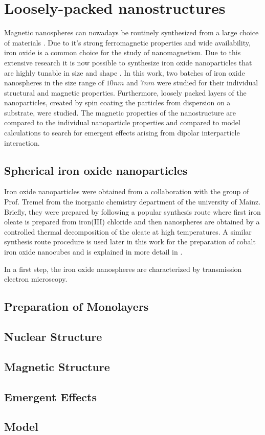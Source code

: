 \documentclass[\main/dresen_thesis.tex]{subfiles}
\begin{document}
\chapter{Loosely-packed nanostructures}\label{ch:looselyPackedNS}
Magnetic nanospheres can nowadays be routinely synthesized from a large choice of materials \cite{Gubin_2005_Magne}.
Due to it's strong ferromagnetic properties and wide availability, iron oxide is a common choice for the study of nanomagnetism.
Due to this extensive research it is now possible to synthesize iron oxide nanoparticles that are highly tunable in size and shape \cite{Wetterskog_2014_Preci}.
In this work, two batches of iron oxide nanospheres in the size range of $10 \unit{nm}$ and $7 \unit{nm}$ were studied for their individual structural and magnetic properties.
Furthermore, loosely packed layers of the nanoparticles, created by spin coating the particles from dispersion on a substrate, were studied.
The magnetic properties of the nanostructure are compared to the individual nanoparticle properties and compared to model calculations to search for emergent effects arising from dipolar interparticle interaction.

\section{Spherical iron oxide nanoparticles}
Iron oxide nanoparticles were obtained from a collaboration with the group of Prof. Tremel from the inorganic chemistry department of the university of Mainz.
Briefly, they were prepared by following a popular synthesis route where first iron oleate is prepared from iron(III) chloride and then nanospheres are obtained by a controlled thermal decomposition of the oleate at high temperatures.
A similar synthesis route procedure is used later in this work for the preparation of cobalt iron oxide nanocubes and is explained in more detail in .

In a first step, the iron oxide nanospheres are characterized by transmission electron microscopy.

\section{Preparation of Monolayers}

\section{Nuclear Structure}

\section{Magnetic Structure}

\section{Emergent Effects}

\section{Model}
\end{document}
